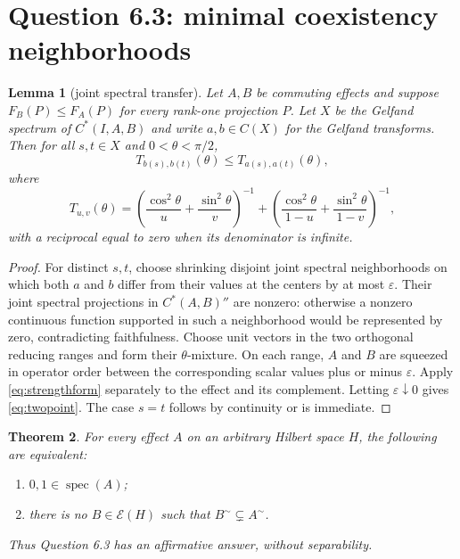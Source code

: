 \documentclass[11pt]{article}
\newtheorem{theorem}{Theorem}
\newtheorem{lemma}[theorem]{Lemma}
\newcommand{\E}{\mathcal E}
\newcommand{\spec}{\operatorname{spec}}
\newcommand{\coex}{\mathord{\sim}}
\begin{document}
\section{Question 6.3: minimal coexistency neighborhoods}

\begin{lemma}[joint spectral transfer]\label{lem:transfer}
Let $A,B$ be commuting effects and suppose $F_B(P)\le F_A(P)$ for every rank-one projection $P$.  Let $X$ be the Gelfand spectrum of $C^*(I,A,B)$ and write $a,b\in C(X)$ for the Gelfand transforms.  Then for all $s,t\in X$ and $0<\theta<\pi/2$,
\begin{equation}\label{eq:twopoint}
 T_{b(s),b(t)}(\theta)\le T_{a(s),a(t)}(\theta),
\end{equation}
where
\[
 T_{u,v}(\theta)=
 \left(\frac{\cos^2\theta}{u}+\frac{\sin^2\theta}{v}\right)^{-1}
 +\left(\frac{\cos^2\theta}{1-u}+\frac{\sin^2\theta}{1-v}\right)^{-1},
\]
with a reciprocal equal to zero when its denominator is infinite.
\end{lemma}

\begin{proof}
For distinct $s,t$, choose shrinking disjoint joint spectral neighborhoods on which both $a$ and $b$ differ from their values at the centers by at most $\varepsilon$.  Their joint spectral projections in $C^*(A,B)''$ are nonzero: otherwise a nonzero continuous function supported in such a neighborhood would be represented by zero, contradicting faithfulness.  Choose unit vectors in the two orthogonal reducing ranges and form their $\theta$-mixture.  On each range, $A$ and $B$ are squeezed in operator order between the corresponding scalar values plus or minus $\varepsilon$.  Apply \eqref{eq:strengthform} separately to the effect and its complement.  Letting $\varepsilon\downarrow0$ gives \eqref{eq:twopoint}.  The case $s=t$ follows by continuity or is immediate.
\end{proof}

\begin{theorem}\label{thm:minimal}
For every effect $A$ on an arbitrary Hilbert space $H$, the following are equivalent:
\begin{enumerate}
\item $0,1\in\spec(A)$;
\item there is no $B\in\E(H)$ such that $B^{\coex}\subsetneq A^{\coex}$.
\end{enumerate}
Thus Question 6.3 has an affirmative answer, without separability.
\end{theorem}
\end{document}
